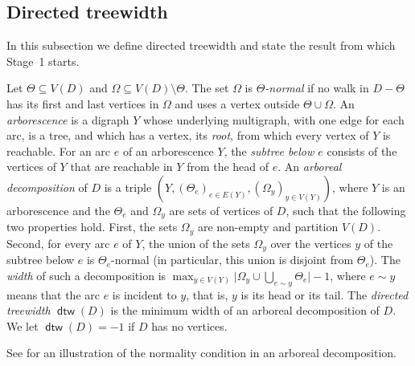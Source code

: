 \documentclass[fontsize=12pt,leading=14pt]{fullpaper}
\DeclareMathOperator{\dtw}{\mathsf{dtw}}
\begin{document}
\subsection{Directed treewidth}\label{sec:prelim-dtw}

In this subsection we define directed treewidth and state the result from which Stage~1 starts.

\begin{definition}\label{def:dtw}
  Let $\Theta\subseteq V(D)$ and $\Omega\subseteq V(D)\setminus\Theta$.
  The set $\Omega$ is \emph{$\Theta$-normal} if no walk in $D-\Theta$ has its first and last vertices in $\Omega$ and uses a vertex outside $\Theta\cup\Omega$.
  An \emph{arborescence} is a digraph $Y$ whose underlying multigraph, with one edge for each arc, is a tree, and which has a vertex, its \emph{root}, from which every vertex of $Y$ is reachable.
  For an arc $e$ of an arborescence $Y$, the \emph{subtree below $e$} consists of the vertices of $Y$ that are reachable in $Y$ from the head of $e$.
  An \emph{arboreal decomposition} of $D$ is a triple $(Y,(\Theta_e)_{e\in E(Y)},(\Omega_y)_{y\in V(Y)})$, where $Y$ is an arborescence and the $\Theta_e$ and $\Omega_y$ are sets of vertices of $D$, such that the following two properties hold.
  First, the sets $\Omega_y$ are non-empty and partition $V(D)$.
  Second, for every arc $e$ of $Y$, the union of the sets $\Omega_y$ over the vertices $y$ of the subtree below $e$ is $\Theta_e$-normal (in particular, this union is disjoint from $\Theta_e$).
  The \emph{width} of such a decomposition is $\max_{y\in V(Y)}\bigl|\Omega_y\cup\bigcup_{e\sim y}\Theta_e\bigr|-1$, where $e\sim y$ means that the arc $e$ is incident to $y$, that is, $y$ is its head or its tail.
  The \emph{directed treewidth} $\dtw(D)$ is the minimum width of an arboreal decomposition of $D$.
  We let $\dtw(D)=-1$ if $D$ has no vertices.
\end{definition}

See  for an illustration of the normality condition in an arboreal decomposition.
\end{document}
